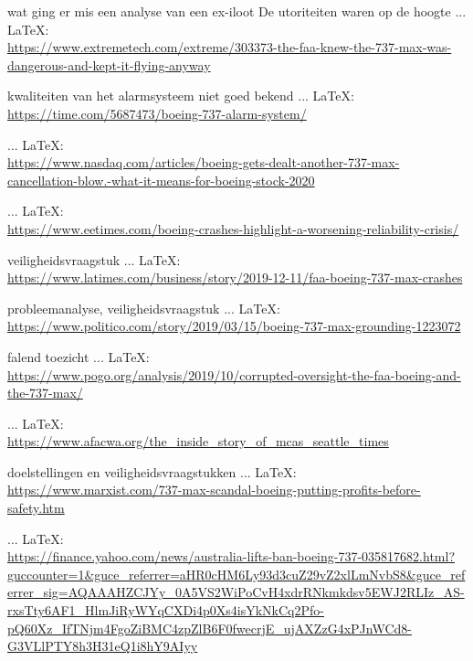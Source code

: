\begin{thebibliography}{99}
{{{    wat ging er mis een analyse van een ex-iloot
    De utoriteiten waren op de hoogte
     ... \LaTeX:\\ \url{https://www.extremetech.com/extreme/303373-the-faa-knew-the-737-max-was-dangerous-and-kept-it-flying-anyway}
    
    kwaliteiten van het alarmsysteem niet goed bekend
     ... \LaTeX:\\ \url{https://time.com/5687473/boeing-737-alarm-system/}
    
     ... \LaTeX:\\ \url{https://www.nasdaq.com/articles/boeing-gets-dealt-another-737-max-cancellation-blow.-what-it-means-for-boeing-stock-2020}
    
     ... \LaTeX:\\ \url{https://www.eetimes.com/boeing-crashes-highlight-a-worsening-reliability-crisis/}
    
    veiligheidsvraagstuk
     ... \LaTeX:\\ \url{https://www.latimes.com/business/story/2019-12-11/faa-boeing-737-max-crashes}
    
    probleemanalyse, veiligheidsvraagstuk
     ... \LaTeX:\\ \url{https://www.politico.com/story/2019/03/15/boeing-737-max-grounding-1223072}
    
    falend toezicht
     ... \LaTeX:\\ \url{https://www.pogo.org/analysis/2019/10/corrupted-oversight-the-faa-boeing-and-the-737-max/}
    
     ... \LaTeX:\\ \url{https://www.afacwa.org/the_inside_story_of_mcas_seattle_times}
    
    doelstellingen en veiligheidsvraagstukken
     ... \LaTeX:\\ \url{https://www.marxist.com/737-max-scandal-boeing-putting-profits-before-safety.htm}
    
     ... \LaTeX:\\ \url{https://finance.yahoo.com/news/australia-lifts-ban-boeing-737-035817682.html?guccounter=1&guce_referrer=aHR0cHM6Ly93d3cuZ29vZ2xlLmNvbS8&guce_referrer_sig=AQAAAHZCJYy_0A5VS2WiPoCvH4xdrRNkmkdsv5EWJ2RLIz_AS-rxsTty6AF1_HlmJiRyWYqCXDi4p0Xs4isYkNkCq2Pfo-pQ60Xz_IfTNjm4FgoZiBMC4zpZlB6F0fwecrjE_ujAXZzG4xPJnWCd8-G3VLlPTY8h3H31eQ1i8hY9AIyy}
    
}}}
\end{thebibliography}
